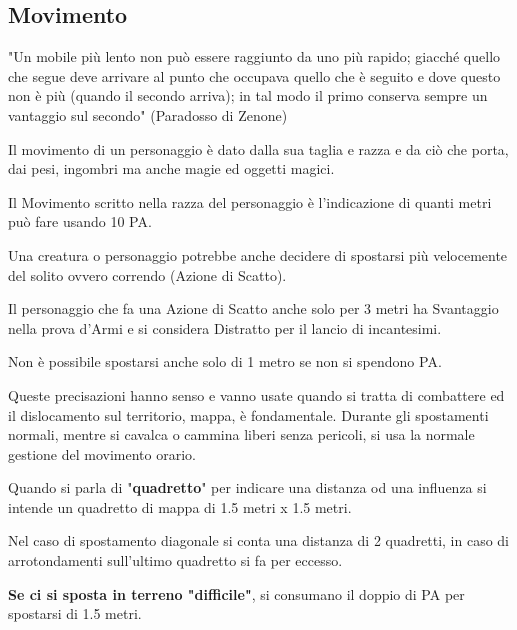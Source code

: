 \documentclass[12pt,a4paper,twoside,openany]{book}
\begin{document}
\subsection{Movimento}\label{movimento}


\begin{changemargin}{0.3cm}{0.3cm}\begin{enfasi}{"Un mobile più lento non può essere raggiunto da uno più rapido; giacché quello che segue deve arrivare al punto che occupava quello che è seguito e dove questo non è più (quando il secondo arriva); in tal modo il primo conserva sempre un vantaggio sul secondo" (Paradosso di Zenone)}
\end{enfasi}\end{changemargin}

\begin{multicols}{2}

Il movimento di un personaggio è dato dalla sua taglia e razza e da ciò che porta, dai pesi, ingombri ma anche magie ed oggetti magici.

Il Movimento scritto nella razza del personaggio è l'indicazione di quanti metri può fare usando 10 PA.

Una creatura o personaggio potrebbe anche decidere di spostarsi più velocemente del solito ovvero correndo (Azione di Scatto).

Il personaggio che fa una Azione di Scatto anche solo per 3 metri  ha Svantaggio nella prova d'Armi e si considera Distratto per il lancio di incantesimi.

Non è possibile spostarsi anche solo di 1 metro se non si spendono PA.

Queste precisazioni hanno senso e vanno usate quando si tratta di combattere ed il dislocamento sul territorio, mappa, è fondamentale. Durante gli spostamenti normali, mentre si cavalca o cammina liberi senza pericoli, si usa la normale gestione del movimento orario.

Quando si parla di "\textbf{quadretto}" per indicare una distanza od una influenza si intende un quadretto di mappa di 1.5 metri x 1.5 metri.

Nel caso di spostamento diagonale si conta una distanza di 2 quadretti, in caso di arrotondamenti sull'ultimo quadretto si fa per eccesso.

\textbf{Se ci si sposta in terreno "difficile"}, si consumano il doppio di PA per spostarsi di 1.5 metri.


\end{multicols}
\end{document}
